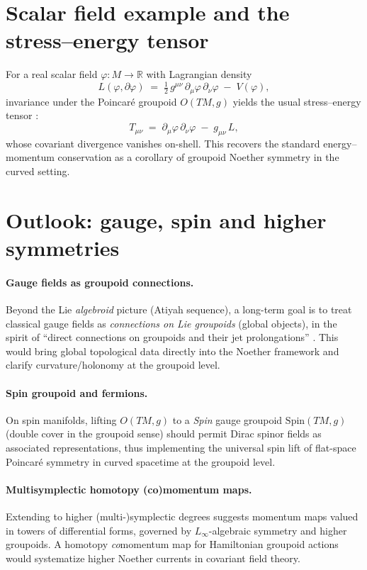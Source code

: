\documentclass[11pt]{article}
\newcommand{\Spin}{\mathrm{Spin}}
\begin{document}
\section{Scalar field example and the stress--energy tensor}
For a real scalar field $\varphi:M\to\mathbb{R}$ with Lagrangian density
\begin{equation}
  L(\varphi,\partial\varphi)\;=\;\tfrac12\,g^{\mu\nu}\,\partial_\mu\varphi\,\partial_\nu\varphi\;-\;V(\varphi),
\end{equation}
invariance under the Poincar\'e groupoid $O(TM,g)$ yields the usual stress--energy tensor \citep[Eq.~(158), \S6]{CostaA2015}:
\begin{equation}
  T_{\mu\nu}\;=\;\partial_\mu\varphi\,\partial_\nu\varphi\;-\;g_{\mu\nu}\,L,
\end{equation}
whose covariant divergence vanishes on-shell. This recovers the standard energy--momentum conservation as a corollary of groupoid Noether symmetry in the curved setting.

\section{Outlook: gauge, spin and higher symmetries}
\paragraph{Gauge fields as groupoid connections.}
Beyond the Lie \emph{algebroid} picture (Atiyah sequence), a long-term goal is to treat classical gauge fields as \emph{connections on Lie groupoids} (global objects), in the spirit of ``direct connections on groupoids and their jet prolongations'' \citep{Paycha2022}. This would bring global topological data directly into the Noether framework and clarify curvature/holonomy at the groupoid level.

\paragraph{Spin groupoid and fermions.}
On spin manifolds, lifting $O(TM,g)$ to a \emph{Spin} gauge groupoid $\Spin(TM,g)$ (double cover in the groupoid sense) should permit Dirac spinor fields as associated representations, thus implementing the universal spin lift of flat-space Poincar\'e symmetry in curved spacetime at the groupoid level.

\paragraph{Multisymplectic homotopy (co)momentum maps.}
Extending \citep[\S5--\S6]{CostaA2015} to higher (multi-)symplectic degrees suggests momentum maps valued in towers of differential forms, governed by $L_\infty$-algebraic symmetry and higher groupoids. A homotopy \emph{co}momentum map for Hamiltonian groupoid actions would systematize higher Noether currents in covariant field theory.
\end{document}
